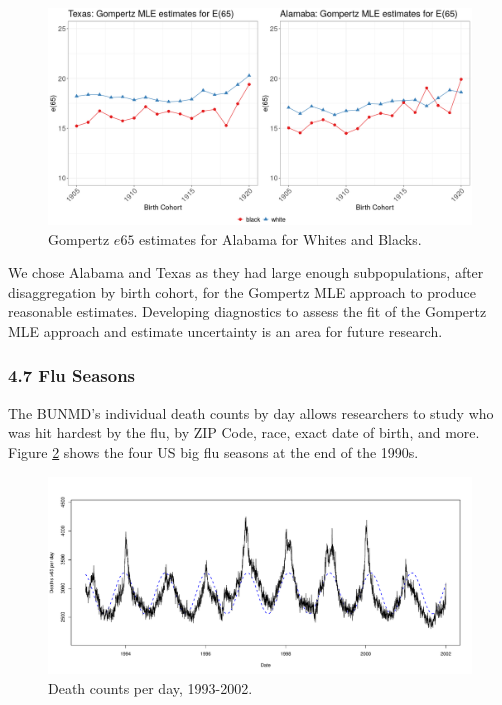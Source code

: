 \documentclass[
  11pt,
]{article}
\begin{document}
\begin{figure}[H]
  \centering
  \includegraphics[width=7in]{../illustrations/gompertz_plot.png}
  \caption{Gompertz $e65$ estimates for Alabama for Whites and Blacks.}
  \label{fig:gompertz}
\end{figure}

We chose Alabama and Texas as they had large enough subpopulations,
after disaggregation by birth cohort, for the Gompertz MLE approach to
produce reasonable estimates. Developing diagnostics to assess the fit
of the Gompertz MLE approach and estimate uncertainty is an area for
future research.

\hypertarget{flu-seasons}{%
\subsubsection{4.7 Flu Seasons}\label{flu-seasons}}

The BUNMD's individual death counts by day allows researchers to study
who was hit hardest by the flu, by ZIP Code, race, exact date of birth,
and more. Figure \ref{fig:flu} shows the four US big flu seasons at the
end of the 1990s.

\begin{figure}[H]
  \centering
  \includegraphics[width=7in]{../illustrations/death_seasonality.pdf}
  \caption{Death counts per day, 1993-2002.}
  \label{fig:flu}
\end{figure}
\end{document}
